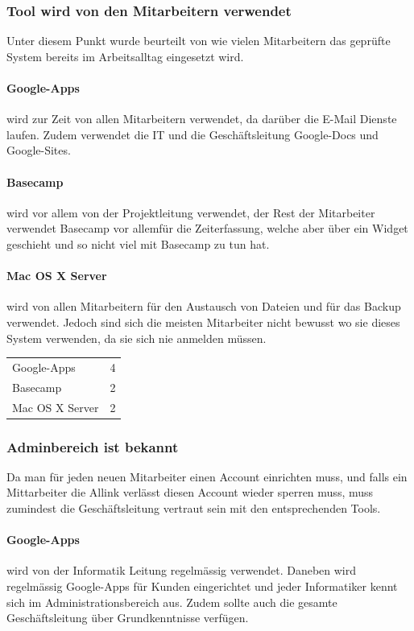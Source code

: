\subsubsection{Tool wird von den Mitarbeitern verwendet}
\label{ssub:Tool wird von den Mitarbeitern verwendet}
Unter diesem Punkt wurde beurteilt von wie vielen Mitarbeitern das geprüfte System bereits im Arbeitsalltag eingesetzt wird.
\paragraph{Google-Apps}
\label{par:1.2Google-Apps}
wird zur Zeit von allen Mitarbeitern verwendet, da darüber die E-Mail Dienste laufen. Zudem verwendet die IT und die Geschäftsleitung Google-Docs und Google-Sites.
\paragraph{Basecamp}
\label{par:1.2Basecamp}
wird vor allem von der Projektleitung verwendet, der Rest der Mitarbeiter verwendet Basecamp vor allemfür die Zeiterfassung, welche aber über ein Widget
geschieht und so nicht viel mit Basecamp zu tun hat.
\paragraph{Mac OS X Server}
\label{par:1.2Mac OS X Server}
wird von allen Mitarbeitern für den Austausch von Dateien und für das Backup verwendet. Jedoch sind sich die meisten Mitarbeiter nicht bewusst wo sie dieses System verwenden, da sie sich nie anmelden müssen.

\begin{tabular}{lc}
Google-Apps & 4\\
Basecamp & 2\\
Mac OS X Server & 2\\
\end{tabular}

\subsubsection{Adminbereich ist bekannt}
\label{ssub:Adminbereich ist bekannt}
Da man für jeden neuen Mitarbeiter einen Account einrichten muss, und falls ein Mittarbeiter die Allink verlässt diesen Account wieder sperren muss, muss zumindest die Geschäftsleitung vertraut sein mit den entsprechenden Tools.
\paragraph{Google-Apps}
\label{par:1.3Google-Apps}
wird von der Informatik Leitung regelmässig verwendet. Daneben wird regelmässig Google-Apps für Kunden eingerichtet und jeder Informatiker kennt sich im Administrationsbereich aus. Zudem sollte auch die gesamte Geschäftsleitung über Grundkenntnisse verfügen.
